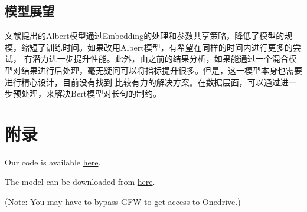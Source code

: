 \documentclass[11pt]{article}
\begin{document}
\subsection{模型展望}
文献\cite{2019albert}提出的Albert模型通过Embedding的处理和参数共享策略，降低了模型的规模，缩短了训练时间。如果改用Albert模型，有希望在同样的时间内进行更多的尝试，%
有潜力进一步提升性能。此外，由之前的结果分析，如果能通过一个混合模型对结果进行后处理，毫无疑问可以将指标提升很多。但是，这一模型本身也需要进行精心设计，目前没有找到%
比较有力的解决方案。在数据层面，可以通过进一步预处理，来解决Bert模型对长句的制约。




\section{附录}\label{code}
Our code is available \href{https://github.com/KAI-YUE/Financial-Entities-Recognition}{here}.\par
The model can be downloaded from \href{https://1drv.ms/u/s!AnzT-wEe9-ARgk4FviqmTab3qyCL?e=sSZOuU}{here}.\par
(Note: You may have to bypass GFW to get access to Onedrive.)
\end{document}

